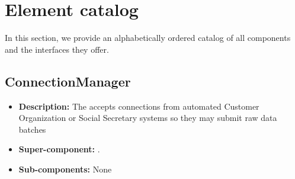 \section{Element catalog}\label{app:catalog}
In this section, we provide an alphabetically ordered catalog of all components and the interfaces they offer.

\subsection{ConnectionManager}
\begin{itemize}
	\item \textbf{Description:} The  accepts connections from automated Customer Organization or Social Secretary systems so they may submit raw data batches
	\item \textbf{Super-component:} .
	\item \textbf{Sub-components:} None
\end{itemize}

